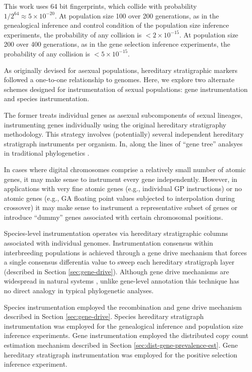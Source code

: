 This work uses 64 bit fingerprints, which collide with probability $1/2^{64} \approx 5 \times 10^{-20}$.
At population size 100 over 200 generations, as in the genealogical inference and control condition of the population size inference experiments, the probability of any collision is $< 2 \times 10^{-15}$.
At population size 200 over 400 generations, as in the gene selection inference experiments, the probability of any collision is $< 5 \times 10^{-15}$.



As originally devised for asexual populations, hereditary stratigraphic markers followed a one-to-one relationship to genomes.
Here, we explore two alternate schemes designed for instrumentation of sexual populations: gene instrumentation and species instrumentation.

The former treats individual genes as asexual subcomponents of sexual lineages, instrumenting genes individually using the original hereditary stratigraphy methodology.
This strategy involves (potentially) several independent hereditary stratigraph instruments per organism.
In, along the lines of ``gene tree'' analsyes in traditional phylogenetics \citep{avise1989gene}.

In cases where digital chromosomes comprise a relatively small number of atomic genes, it may make sense to instrument every gene independently.
However, in applications with very fine atomic genes (e.g., individual GP instructions) or no atomic genes (e.g., GA floating point values subjected to interpolation during crossover) it may make sense to instrument a representative subset of genes or introduce ``dummy'' genes associated with certain chromosomal positions.

Species-level instrumentation operates via hereditary stratigraphic columns associated with individual genomes.
Instrumentation consensus within interbreeding populations is achieved through a gene drive mechanism that forces a single consensus differentia value to sweep each hereditary stratigraph layer (described in Section \ref{sec:gene-drive}).
Although gene drive mechanisms are widespread in natural systems \citep{alphey2020standardizing, price2020resistance}, unlike gene-level annotation this technique has no direct analogy in typical phylogenetic analyses.

Species instrumentation employed the recombination and gene drive mechanism described in Section \ref{sec:gene-drive}.
Species hereditary stratigraph instrumentation was employed for the genealogical inference and population size inference experiments.
Gene instrumentation employed the distributed copy count estimation mechanism described in Section \ref{sec:dist-gene-prevalence-est}.
Gene hereditary stratigraph instrumentation was employed for the positive selection inference experiment.

